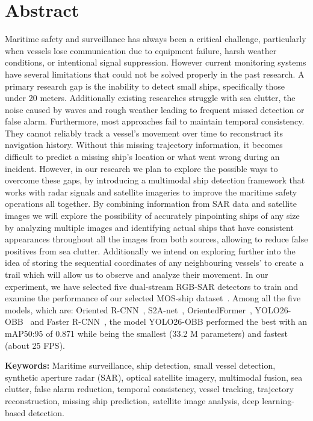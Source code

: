 
\section*{Abstract} Maritime safety and surveillance has always been a critical challenge, particularly when vessels lose communication due to equipment failure, harsh weather conditions, or intentional signal suppression. However current monitoring systems have several limitations that could not be solved properly in the past research. A primary research gap is the inability to detect small ships, specifically those under 20 meters. Additionally existing researches struggle with sea clutter, the noise caused by waves and rough weather leading to frequent missed detection or false alarm. Furthermore, most approaches fail to maintain temporal consistency. They cannot reliably track a vessel’s movement over time to reconstruct its navigation history. Without this missing trajectory information, it becomes difficult to predict a missing ship's location or what went wrong during an incident. However, in our research we plan to explore the possible ways to overcome these gaps, by introducing a multimodal ship detection framework that works with radar signals and satellite imageries to improve the maritime safety operations all together. By combining information from SAR data and satellite images we will explore the possibility of accurately pinpointing ships of any size by analyzing multiple images and identifying actual ships that have consistent appearances throughout all the images from both sources, allowing to reduce false positives from sea clutter. Additionally we intend on exploring further into the idea of storing the sequential coordinates of any neighbouring vessels’ to create a trail which will allow us to observe and analyze their movement. In our experiment, we have selected five dual-stream RGB-SAR detectors to train and examine the performance of our selected MOS-ship dataset~\cite{you2026multi}. Among all the five models, which are: Oriented R-CNN~\cite{xie2021oriented}, S2A-net~\cite{han2021align}, OrientedFormer~\cite{zhao2024orientedformer}, YOLO26-OBB~\cite{jocher2026ultralytics} and Faster R-CNN~\cite{7485869}, the model YOLO26-OBB performed the best with an mAP50:95 of 0.871 while being the smallest (33.2 M parameters) and fastest (about 25 FPS).



\vspace{1cm}
\textbf{Keywords:} Maritime surveillance, ship detection, small vessel detection, synthetic aperture radar (SAR), optical satellite imagery, multimodal fusion, sea clutter, false alarm reduction, temporal consistency, vessel tracking, trajectory reconstruction, missing ship prediction, satellite image analysis, deep learning-based detection.
\pagebreak
